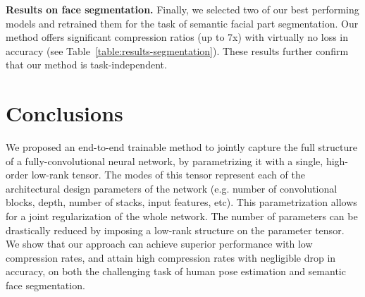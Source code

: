 \documentclass[10pt,twocolumn,letterpaper]{article}
\begin{document}
\textbf{Results on face segmentation.}
Finally, we selected two of our best performing models and retrained them for the task of semantic facial part segmentation. Our method offers significant compression ratios (up to 7x) with virtually no loss in accuracy (see Table~\ref{table:results-segmentation}). These results further confirm that our method is task-independent.

 \section{Conclusions}
We proposed an end-to-end trainable method to jointly capture the full structure of a fully-convolutional neural network, by parametrizing it with a single, high-order low-rank tensor. The modes of this tensor represent each of the architectural design parameters of the network (e.g. number of convolutional blocks, depth, number of stacks, input features, etc). This parametrization allows for a joint regularization of the whole network. The number of parameters can be drastically reduced by imposing a low-rank structure on the parameter tensor. We show that our approach can achieve superior performance with low compression rates, and attain high compression rates with negligible drop in accuracy, on both the challenging task of human pose estimation and semantic face segmentation. 
\end{document}
